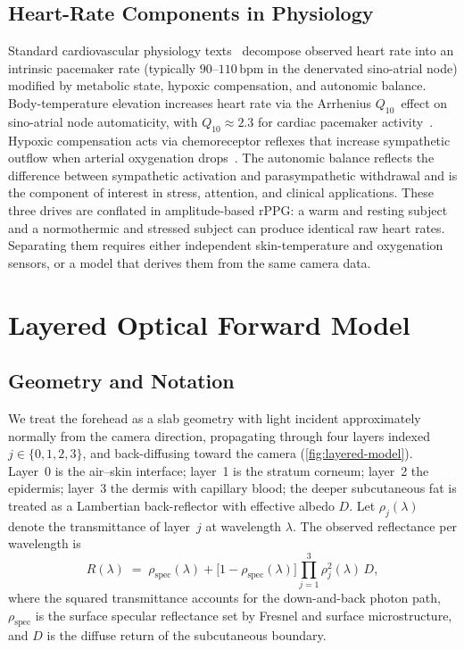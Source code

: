 \documentclass[10pt,twocolumn,a4paper]{article}
\theoremstyle{definition}
\newcommand{\Qten}{Q_{10}}
\begin{document}
\subsection{Heart-Rate Components in Physiology}

Standard cardiovascular physiology
texts~\cite{guyton2006,berne2010,levick2009} decompose observed heart
rate into an intrinsic pacemaker rate (typically $90$--$110\,\mathrm{bpm}$
in the denervated sino-atrial node) modified by metabolic
state, hypoxic compensation, and autonomic balance. Body-temperature
elevation increases heart rate via the Arrhenius $\Qten$~effect on
sino-atrial node automaticity, with $\Qten\approx 2.3$ for cardiac
pacemaker activity~\cite{stevens1989q10,delgado2008}. Hypoxic compensation acts via
chemoreceptor reflexes that increase sympathetic outflow when arterial
oxygenation drops~\cite{guyenet2014}. The autonomic balance reflects
the difference between sympathetic activation and parasympathetic
withdrawal and is the component of interest in stress, attention, and
clinical applications. These three drives are conflated in
amplitude-based rPPG: a warm and resting subject and a normothermic
and stressed subject can produce identical raw heart rates. Separating
them requires either independent skin-temperature and oxygenation
sensors, or a model that derives them from the same camera data.

\section{Layered Optical Forward Model}\label{sec:forward}

\subsection{Geometry and Notation}

We treat the forehead as a slab geometry with light incident
approximately normally from the camera direction, propagating through
four layers indexed $j\in\{0,1,2,3\}$, and back-diffusing toward the
camera (\cref{fig:layered-model}). Layer~0 is the air--skin interface;
layer~1 is the stratum corneum; layer~2 the epidermis; layer~3 the
dermis with capillary blood; the deeper subcutaneous fat is treated as
a Lambertian back-reflector with effective albedo $D$. Let
$\rho_{j}(\lambda)$ denote the transmittance of layer~$j$ at wavelength
$\lambda$. The observed reflectance per wavelength is
\begin{equation}
    R(\lambda)
    \;=\; \rho_{\mathrm{spec}}(\lambda)
    + \bigl[1 - \rho_{\mathrm{spec}}(\lambda)\bigr]
      \prod_{j=1}^{3}\rho_{j}^{2}(\lambda)\, D,
    \label{eq:R-of-lambda}
\end{equation}
where the squared transmittance accounts for the down-and-back photon
path, $\rho_{\mathrm{spec}}$ is the surface specular reflectance set
by Fresnel and surface microstructure, and $D$ is the diffuse return
of the subcutaneous boundary.
\end{document}
